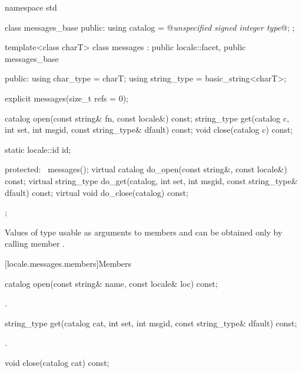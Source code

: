 %
\begin{codeblock}
namespace std {
  class messages_base {
  public:
    using catalog = @\textit{unspecified signed integer type}@;
  };

  template<class charT>
    class messages : public locale::facet, public messages_base {
    public:
      using char_type   = charT;
      using string_type = basic_string<charT>;

      explicit messages(size_t refs = 0);

      catalog open(const string& fn, const locale&) const;
      string_type get(catalog c, int set, int msgid,
                      const string_type& dfault) const;
      void close(catalog c) const;

      static locale::id id;

    protected:
      ~messages();
      virtual catalog do_open(const string&, const locale&) const;
      virtual string_type do_get(catalog, int set, int msgid,
                                 const string_type& dfault) const;
      virtual void do_close(catalog) const;
    };
}
\end{codeblock}

\pnum
Values of type 
usable as arguments to members  and 
can be obtained only by calling member .

[locale.messages.members]{Members}

%
\begin{itemdecl}
catalog open(const string& name, const locale& loc) const;
\end{itemdecl}

\begin{itemdescr}
\pnum
\returns
{}.
\end{itemdescr}

%
\begin{itemdecl}
string_type get(catalog cat, int set, int msgid, const string_type& dfault) const;
\end{itemdecl}

\begin{itemdescr}
\pnum
\returns
{}.
\end{itemdescr}

%
\begin{itemdecl}
void close(catalog cat) const;
\end{itemdecl}

